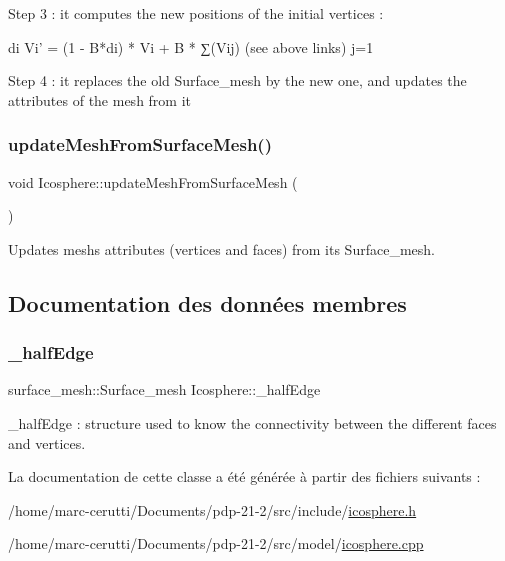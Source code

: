Step 3 \+: it computes the new positions of the initial vertices \+: \begin{DoxyVerb}                                 di
     Vi' = (1 - B*di) * Vi + B * ∑(Vij)   (see above links)
                                j=1
\end{DoxyVerb}


Step 4 \+: it replaces the old Surface\+\_\+mesh by the new one, and updates the attributes of the mesh from it \mbox{\label{class_icosphere_a38645b095ea6895c2aa5bbff7d8edf20}} 
\subsubsection{\texorpdfstring{update\+Mesh\+From\+Surface\+Mesh()}{updateMeshFromSurfaceMesh()}}
{\footnotesize\ttfamily void Icosphere\+::update\+Mesh\+From\+Surface\+Mesh (\begin{DoxyParamCaption}{ }\end{DoxyParamCaption})\hspace{0.3cm}{\ttfamily [private]}}



Updates mesh\textquotesingle{}s attributes (vertices and faces) from its Surface\+\_\+mesh. 



\subsection{Documentation des données membres}
\mbox{\label{class_icosphere_a454cb570544ec34a65e2f3753fd3dc14}} 
\subsubsection{\texorpdfstring{\+\_\+half\+Edge}{\_halfEdge}}
{\footnotesize\ttfamily surface\+\_\+mesh\+::\+Surface\+\_\+mesh Icosphere\+::\+\_\+half\+Edge\hspace{0.3cm}{\ttfamily [private]}}



\+\_\+half\+Edge \+: structure used to know the connectivity between the different faces and vertices. 



La documentation de cette classe a été générée à partir des fichiers suivants \+:\begin{DoxyCompactItemize}
\item 
/home/marc-\/cerutti/\+Documents/pdp-\/21-\/2/src/include/\hyperlink{icosphere_8h}{icosphere.\+h}\item 
/home/marc-\/cerutti/\+Documents/pdp-\/21-\/2/src/model/\hyperlink{icosphere_8cpp}{icosphere.\+cpp}\end{DoxyCompactItemize}
